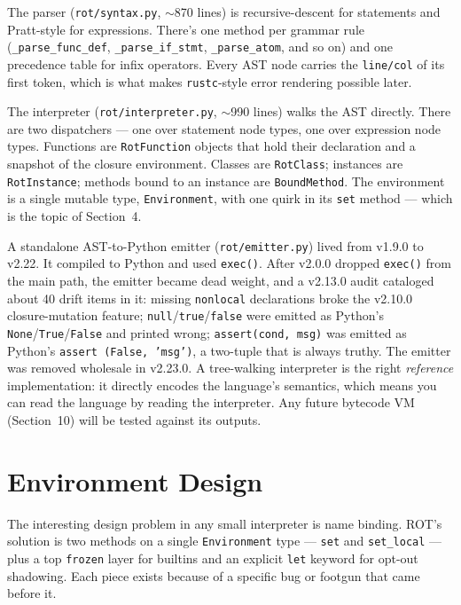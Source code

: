 \documentclass[11pt]{article}
\begin{document}
The parser (\texttt{rot/syntax.py}, $\sim$870 lines) is recursive-descent for statements and Pratt-style for expressions. There's one method per grammar rule (\texttt{\_parse\_func\_def}, \texttt{\_parse\_if\_stmt}, \texttt{\_parse\_atom}, and so on) and one precedence table for infix operators. Every AST node carries the \texttt{line/col} of its first token, which is what makes \texttt{rustc}-style error rendering possible later.

The interpreter (\texttt{rot/interpreter.py}, $\sim$990 lines) walks the AST directly. There are two dispatchers --- one over statement node types, one over expression node types. Functions are \texttt{RotFunction} objects that hold their declaration and a snapshot of the closure environment. Classes are \texttt{RotClass}; instances are \texttt{RotInstance}; methods bound to an instance are \texttt{BoundMethod}. The environment is a single mutable type, \texttt{Environment}, with one quirk in its \texttt{set} method --- which is the topic of Section~4.

A standalone AST-to-Python emitter (\texttt{rot/emitter.py}) lived from v1.9.0 to v2.22. It compiled to Python and used \texttt{exec()}. After v2.0.0 dropped \texttt{exec()} from the main path, the emitter became dead weight, and a v2.13.0 audit cataloged about 40 drift items in it: missing \texttt{nonlocal} declarations broke the v2.10.0 closure-mutation feature; \texttt{null}/\texttt{true}/\texttt{false} were emitted as Python's \texttt{None}/\texttt{True}/\texttt{False} and printed wrong; \texttt{assert(cond, msg)} was emitted as Python's \texttt{assert (False, 'msg')}, a two-tuple that is always truthy. The emitter was removed wholesale in v2.23.0. A tree-walking interpreter is the right \emph{reference} implementation: it directly encodes the language's semantics, which means you can read the language by reading the interpreter. Any future bytecode VM (Section~10) will be tested against its outputs.

\section{Environment Design}

The interesting design problem in any small interpreter is name binding. ROT's solution is two methods on a single \texttt{Environment} type --- \texttt{set} and \texttt{set\_local} --- plus a top \texttt{frozen} layer for builtins and an explicit \texttt{let} keyword for opt-out shadowing. Each piece exists because of a specific bug or footgun that came before it.
\end{document}
